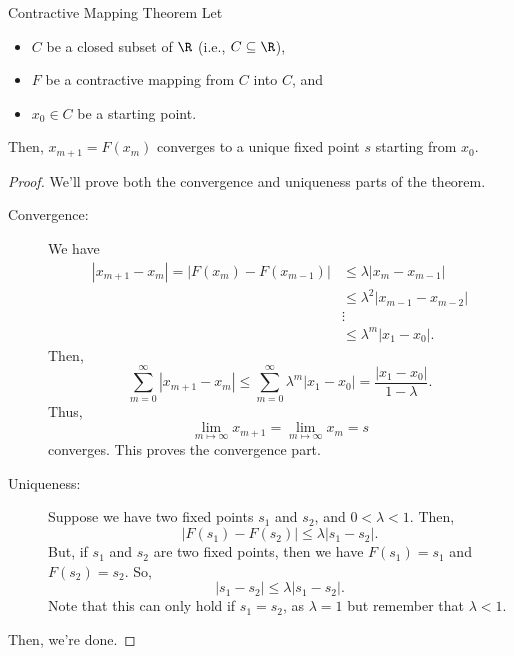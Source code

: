 \documentclass[letterpaper]{article}
\begin{document}
\begin{theorem}{Contractive Mapping Theorem}{}
    Let 
    \begin{itemize}
        \item $C$ be a closed subset of $\R$ (i.e., $C \subseteq \R$),
        \item $F$ be a contractive mapping from $C$ into $C$, and 
        \item $x_0 \in C$ be a starting point. 
    \end{itemize}
    Then, $x_{m + 1} = F(x_m)$ converges to a unique fixed point $s$ starting from $x_0$.
\end{theorem}
\begin{proof}
    We'll prove both the convergence and uniqueness parts of the theorem.
    \begin{description}
        \item[Convergence:] We have 
        \[\begin{aligned}
            |x_{m + 1} - x_m| = |F(x_m) - F(x_{m - 1})| &\leq \lambda |x_m - x_{m - 1}| \\ 
                &\leq \lambda^2 |x_{m - 1} - x_{m - 2}| \\ 
                &\vdots \\ 
                &\leq \lambda^m |x_1 - x_0|.
        \end{aligned}\]
        Then, \[\sum_{m = 0}^{\infty} |x_{m + 1} - x_m| \leq \sum_{m = 0}^{\infty} \lambda^m |x_1 - x_0| = \frac{|x_1 - x_0|}{1 - \lambda}.\]
        Thus, \[\lim_{m \mapsto \infty} x_{m + 1} = \lim_{m \mapsto \infty} x_m = s\] converges. This proves the convergence part. 

        \item[Uniqueness:] Suppose we have two fixed points $s_1$ and $s_2$, and $0 < \lambda < 1$. Then, \[|F(s_1) - F(s_2)| \leq \lambda |s_1 - s_2|.\]
        But, if $s_1$ and $s_2$ are two fixed points, then we have $F(s_1) = s_1$ and $F(s_2) = s_2$. So, 
        \[|s_1 - s_2| \leq \lambda |s_1 - s_2|.\]
        Note that this can only hold if $s_1 = s_2$, as $\lambda = 1$ but remember that $\lambda < 1$. 
    \end{description}
    Then, we're done. 
\end{proof}
\end{document}
